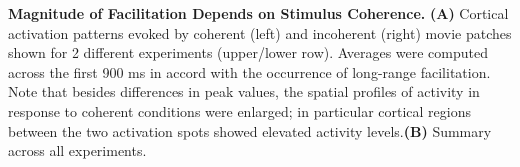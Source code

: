 \textbf{Magnitude of Facilitation Depends on Stimulus Coherence.}
\textbf{(A)} Cortical activation patterns evoked by coherent (left) and
incoherent (right) movie patches shown for 2 different experiments
(upper/lower row).  Averages were computed across the first 900 ms in
accord with the occurrence of long-range facilitation. Note that besides
differences in peak values, the spatial profiles of activity in response to
coherent conditions were enlarged; in particular cortical regions between
the two activation spots showed elevated activity levels.\textbf{(B)}
Summary across all experiments.
